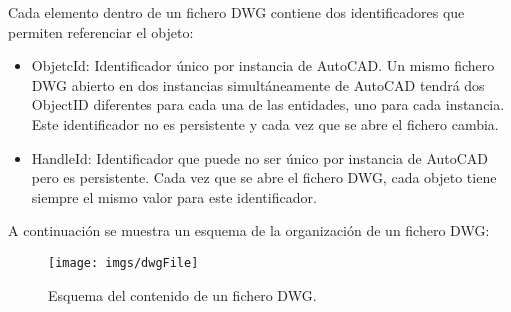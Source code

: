 Cada elemento dentro de un fichero DWG contiene dos identificadores que permiten referenciar el objeto:

\begin{itemize}

\item{ObjetcId: Identificador único por instancia de AutoCAD. Un mismo fichero DWG abierto en dos instancias simultáneamente de AutoCAD tendrá dos ObjectID diferentes para cada una de las entidades, uno para cada instancia. Este identificador no es persistente y cada vez que se abre el fichero cambia.}

\item{HandleId: Identificador que puede no ser único por instancia de AutoCAD pero es persistente. Cada vez que se abre el fichero DWG, cada objeto tiene siempre el mismo valor para este identificador.}

\end{itemize}

A continuación se muestra un esquema de la organización de un fichero DWG:

\begin{figure}[H]
\begin{center}
\texttt{[image: imgs/dwgFile]}
\caption{Esquema del contenido de un fichero DWG.}
\end{center}
\end{figure}




